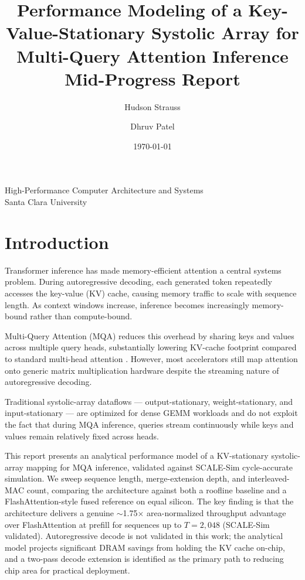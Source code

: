 \documentclass[11pt]{article}
\title{
\textbf{
Performance Modeling of a Key-Value-Stationary
Systolic Array for Multi-Query Attention Inference
}
\\[1ex]
\large Mid-Progress Report
}
\author{
Hudson Strauss \and Dhruv Patel
}
\date{\today}
\begin{document}
\maketitle

\begin{center}
High-Performance Computer Architecture and Systems \\
Santa Clara University
\end{center}

\vspace{0.5em}

\section{Introduction}

Transformer inference has made memory-efficient attention a central
systems problem. During autoregressive decoding, each generated token
repeatedly accesses the key-value (KV) cache, causing memory traffic
to scale with sequence length. As context windows increase, inference
becomes increasingly memory-bound rather than compute-bound.

Multi-Query Attention (MQA) reduces this overhead by sharing keys and
values across multiple query heads, substantially lowering KV-cache
footprint compared to standard multi-head attention
\parencite{ainslie2023gqa}. However, most accelerators still map
attention onto generic matrix multiplication hardware despite the
streaming nature of autoregressive decoding.

Traditional systolic-array dataflows --- output-stationary,
weight-stationary, and input-stationary --- are optimized for
dense GEMM workloads and do not exploit the fact that during
MQA inference, queries stream continuously while keys and
values remain relatively fixed across heads.

This report presents an analytical performance model of a
KV-stationary systolic-array mapping for MQA inference,
validated against SCALE-Sim cycle-accurate simulation.
We sweep sequence length, merge-extension depth, and
interleaved-MAC count, comparing the architecture against
both a roofline baseline and a FlashAttention-style fused
reference on equal silicon.
The key finding is that the architecture delivers a genuine
\(\sim\)1.75$\times$ area-normalized throughput advantage
over FlashAttention at prefill for sequences up to
\(T = 2{,}048\) (SCALE-Sim validated).
Autoregressive decode is not validated in this work;
the analytical model projects significant DRAM savings
from holding the KV cache on-chip, and a two-pass decode
extension is identified as the primary path to reducing
chip area for practical deployment.
\end{document}
